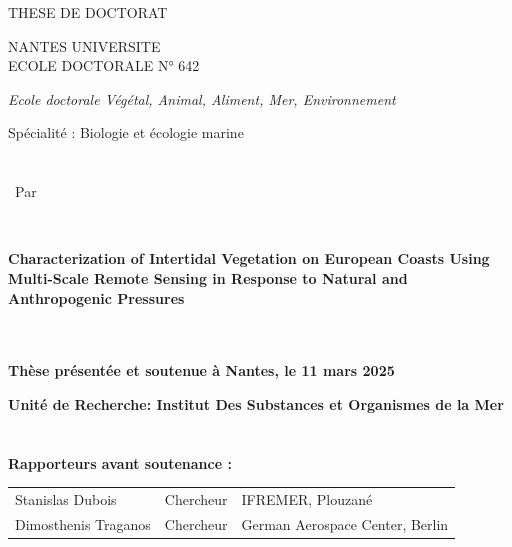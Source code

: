 \begin{titlepage}
\AddToShipoutPictureBG*{%
    \BackgroundImage
}

\vspace{1.2cm}

{\LARGE {\Huge T}HESE DE DOCTORAT}

\vspace{1.8cm}
{\fontsize{14}{18}\selectfont NANTES UNIVERSITE} \\

{\large E}COLE {\large D}OCTORALE N° 642


{\fontsize{12}{16}\selectfont \textit{Ecole doctorale Végétal, Animal, Aliment, Mer, Environnement}}

{\fontsize{12}{16}\selectfont Spécialité : Biologie et écologie marine} \\\\\\

{\fontsize{12}{16}\ Par}
\vspace{0.2cm}

 \\

\parbox{17cm}{
{\fontsize{16}{20}\selectfont \textbf{Characterization of Intertidal Vegetation on European Coasts Using Multi-Scale Remote Sensing in Response to Natural and Anthropogenic Pressures} }
}\\\\

{\fontsize{11}{15}\selectfont \textbf{Thèse présentée et soutenue à Nantes, le 11 mars 2025}}

{\fontsize{11}{15}\selectfont \textbf{Unité de Recherche: Institut Des Substances et Organismes de la Mer}}
\\\\\\

{\fontsize{12}{16}\selectfont \textbf{Rapporteurs avant soutenance :}}

\begin{tabular}{@{}l l l@{}}
    {\fontsize{10}{14}\selectfont \textcolor{textgray}{Stanislas Dubois}} & 
    {\fontsize{10}{14}\selectfont \textcolor{textgray}{Chercheur}} & 
    {\fontsize{10}{14}\selectfont \textcolor{textgray}{IFREMER, Plouzané}} \\

    {\fontsize{10}{14}\selectfont \textcolor{textgray}{Dimosthenis Traganos}} & 
    {\fontsize{10}{14}\selectfont \textcolor{textgray}{Chercheur}} & 
    {\fontsize{10}{14}\selectfont \textcolor{textgray}{German Aerospace Center, Berlin}} \\


\end{tabular}
\end{titlepage}
